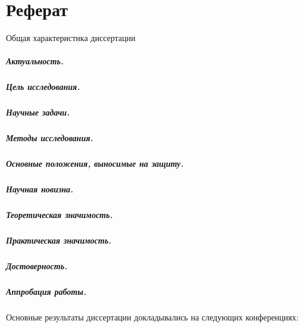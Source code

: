 \chapter*{Реферат}

\begin{center}
    Общая характеристика диссертации
\end{center}

\paragraph*{Актуальность.}

\paragraph*{Цель исследования.}
\paragraph*{Научные задачи.}

\paragraph*{Методы исследования.}

\paragraph*{Основные положения, выносимые на защиту.}


\paragraph*{Научная новизна.}

\paragraph*{Теоретическая значимость.}
\paragraph*{Практическая значимость.}
\paragraph*{Достоверность.}
\paragraph*{Аппробация работы.}
Основные результаты диссертации докладывались на следующих конференциях:
\printConferenceRU

